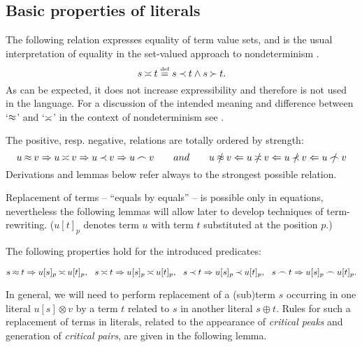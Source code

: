 \subsection{Basic properties of literals}

The following relation expresses equality of term value sets, and is the usual
 interpretation of equality
 in the set-valued approach to nondeterminism \cite{PS1,Kap}. 
\MyLPar \begin{equation}\MyLPar \label{eq:Seteq-definition}
s\Seteq t\Def s\Incl t\land s\Cont t.
\end{equation}
As can be expected, it does not increase 
expressibility and therefore is not used in the language.
For a discussion of the intended meaning and difference 
between `$\mathbin{\approx}$' and `$\mathbin{\asymp}$' in the context of nondeterminism 
see \cite{MW,Mich}. 

The positive, resp. negative, relations are totally ordered by strength:
\MyLPar\begin{equation}\MyLPar \label{eq:rel-order}\label{eq:rel-orderNG}
u\Eq v \impl u \Seteq v \impl u\Incl v \impl u\Int v
\hspace{2em} and \hspace{2em}
 u\notEq v \Leftarrow u \notSeteq v \Leftarrow
 u\notIncl v \Leftarrow u\notInt v 
\end{equation}
Derivations and lemmas below refer always to the strongest possible relation.

Replacement of terms --
``equals by equals'' -- is possible only in equations, nevertheless
the following lemmas will allow later to develop techniques of term-rewriting.
($u[t]_p$ denotes term $u$ with term $t$ substituted at the position $p$.)

\begin{LEMMA} \label{le:replacement}%
The following properties hold for the introduced predicates:

\(s\Eq t \impl   u[s]_p \Seteq  u[t]_p, \ \ 
s\Seteq t  \impl  u[s]_p \Seteq  u[t]_p, \ \ 
s\Incl t  \impl  u[s]_p \Incl  u[t]_p, \ \   
s\Int t  \impl  u[s]_p \Int  u[t]_p.\) 
\end{LEMMA}
In general, we will need to perform replacement of a (sub)term $s$ occurring in
one literal $u[s]\otimes v$ by a term $t$ related to $s$ in another literal
$s\oplus t$. 
Rules for such a replacement of terms in literals, related to the appearance 
of {\em critical peaks} \cite{Der} and generation of {\em
critical pairs}, are given in the following lemma.

